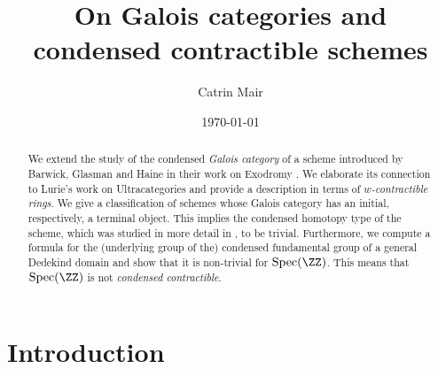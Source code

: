 \documentclass[leqno]{article}
\title{\Large On Galois categories and condensed contractible schemes}
\author{Catrin Mair}
\date{\today}
\renewcommand{\Spec}{\mathrm{Spec}}
\begin{document}
\maketitle


\begin{abstract} 
 We extend the study of the condensed \textit{Galois category} of a scheme introduced by Barwick, Glasman and Haine in their work on Exodromy \cite{Exodromy}. We elaborate its connection to Lurie's work on Ultracategories \cite{Ultracategories} and provide a description in terms of \textit{$w$-contractible rings}.
 We give a classification of schemes whose Galois category has an initial, respectively, a terminal object. This implies the condensed homotopy type of the scheme, which was studied in more detail in \cite{The_condensed_homotopy_type}, to be trivial.
 Furthermore, we compute a formula for the (underlying group of the) condensed fundamental group of a general Dedekind domain and show that it is non-trivial for $\Spec(\ZZ)$.
 This means that $\Spec(\ZZ)$ is not \textit{condensed contractible}.
\end{abstract}

\tableofcontents

\newpage


\section{Introduction}
\end{document}
